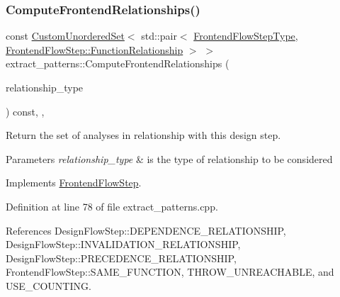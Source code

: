 \subsubsection{\texorpdfstring{Compute\+Frontend\+Relationships()}{ComputeFrontendRelationships()}}
{\footnotesize\ttfamily const \hyperlink{classCustomUnorderedSet}{Custom\+Unordered\+Set}$<$ std\+::pair$<$ \hyperlink{frontend__flow__step_8hpp_afeb3716c693d2b2e4ed3e6d04c3b63bb}{Frontend\+Flow\+Step\+Type}, \hyperlink{classFrontendFlowStep_af7cf30f2023e5b99e637dc2058289ab0}{Frontend\+Flow\+Step\+::\+Function\+Relationship} $>$ $>$ extract\+\_\+patterns\+::\+Compute\+Frontend\+Relationships (\begin{DoxyParamCaption}\item[{const \hyperlink{classDesignFlowStep_a723a3baf19ff2ceb77bc13e099d0b1b7}{Design\+Flow\+Step\+::\+Relationship\+Type}}]{relationship\+\_\+type }\end{DoxyParamCaption}) const\hspace{0.3cm}{\ttfamily [override]}, {\ttfamily [private]}, {\ttfamily [virtual]}}



Return the set of analyses in relationship with this design step. 


\begin{DoxyParams}{Parameters}
{\em relationship\+\_\+type} & is the type of relationship to be considered \\
\hline
\end{DoxyParams}


Implements \hyperlink{classFrontendFlowStep_abeaff70b59734e462d347ed343dd700d}{Frontend\+Flow\+Step}.



Definition at line 78 of file extract\+\_\+patterns.\+cpp.



References Design\+Flow\+Step\+::\+D\+E\+P\+E\+N\+D\+E\+N\+C\+E\+\_\+\+R\+E\+L\+A\+T\+I\+O\+N\+S\+H\+IP, Design\+Flow\+Step\+::\+I\+N\+V\+A\+L\+I\+D\+A\+T\+I\+O\+N\+\_\+\+R\+E\+L\+A\+T\+I\+O\+N\+S\+H\+IP, Design\+Flow\+Step\+::\+P\+R\+E\+C\+E\+D\+E\+N\+C\+E\+\_\+\+R\+E\+L\+A\+T\+I\+O\+N\+S\+H\+IP, Frontend\+Flow\+Step\+::\+S\+A\+M\+E\+\_\+\+F\+U\+N\+C\+T\+I\+ON, T\+H\+R\+O\+W\+\_\+\+U\+N\+R\+E\+A\+C\+H\+A\+B\+LE, and U\+S\+E\+\_\+\+C\+O\+U\+N\+T\+I\+NG.

\mbox{\label{classextract__patterns_accaa03e77d1878c22602ff594e1206d3}} 
